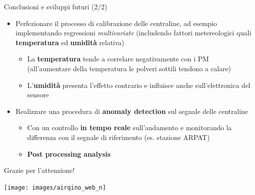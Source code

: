 \begin{frame}{Conclusioni e sviluppi futuri (2/2)}
\begin{itemize}
  \item Perfezionare il processo di calibrazione delle centraline, ad esempio implementando regressioni \textit{multivariate} (includendo fattori metereologici quali \textbf{temperatura} ed \textbf{umidità} relativa)\vspace{0.1cm}
  \begin{itemize}
    \item La \textbf{temperatura} tende a correlare negativamente con i PM (all'aumentare della temperatura le polveri sottili tendono a calare)
    \item L'\textbf{umidità} presenta l'effetto contrario e influisce anche sull'elettronica del sensore
  \end{itemize}\vspace{0.1cm}
  \item Realizzare una procedura di \textbf{anomaly detection} sul segnale delle centraline\vspace{0.1cm}
  \begin{itemize}
    \item Con un controllo \textbf{in tempo reale} sull'andamento e monitorando la differenza con il segnale di riferimento (es. stazione ARPAT)
    \item \textbf{Post processing analysis}
  \end{itemize}
\end{itemize}
\end{frame}

\begin{frame}[noframenumbering]{Grazie per l'attenzione!}
\begin{center}
\texttt{[image: images/airqino\_web\_n]}
\end{center}
\end{frame}

